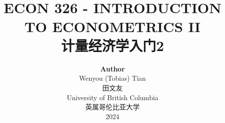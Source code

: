 \title{ \normalsize \textsc{}
		\\ [2.0cm]
		\HRule{1.5pt} \\
		\LARGE \textbf{\uppercase{ECON 326 - Introduction to Econometrics II}
		\HRule{2.0pt} \\ [0.6cm] \LARGE{计量经济学入门2} \vspace*{10\baselineskip}}
		}
\date{}
\author{\textbf{Author} \\ 
		Wenyou (Tobias) Tian \\
        田文友 \\
		University of British Columbia \\
        英属哥伦比亚大学 \\
		2024}

\maketitle
\newpage

\tableofcontents
\newpage